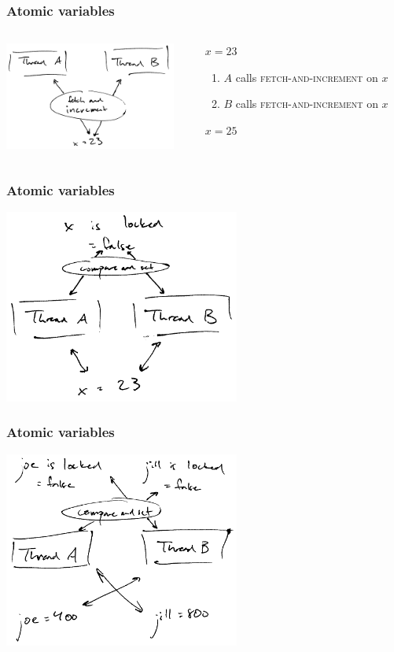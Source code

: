 \documentclass[aspectratio=1610]{beamer}
\begin{document}
  \begin{frame}
    \frametitle{Atomic variables}

    \begin{columns}
      \begin{column}{0.5\textwidth}
        \centering
        \includegraphics[width=160pt]{../figures/atomic}
      \end{column}
      \hfill
      \begin{column}{0.5\textwidth}
        $x = 23$

        \begin{enumerate}
          \item $A$ calls \textsc{fetch-and-increment} on $x$
          \item $B$ calls \textsc{fetch-and-increment} on $x$
        \end{enumerate}

        $x = 25$
      \end{column}
    \end{columns}
  \end{frame}

  \begin{frame}
    \frametitle{Atomic variables}
    \centering

    \includegraphics[width=220pt]{../figures/lock}
  \end{frame}

  \begin{frame}
    \frametitle{Atomic variables}
    \centering

    \includegraphics[width=220pt]{../figures/multiple-locks}
  \end{frame}
\end{document}

